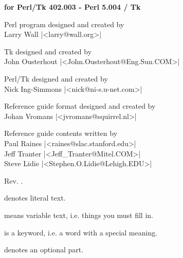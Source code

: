 \documentclass{refbase}
\begin{document}

\begin{titlepage}
\addtolength{\evensidemargin}{2cm}
\addtolength{\textwidth}{-2.1cm}

{\bf for Perl/Tk 402.003 - Perl 5.004 / Tk \tkrev}

\vfill
Perl program designed and created by \\
Larry Wall |<larry@wall.org>|

\vfill
Tk designed and created by \\
John Ousterhout |<John.Ousterhout@Eng.Sun.COM>|

\vfill
Perl/Tk designed and created by \\
Nick Ing-Simmons |<nick@ni-s.u-net.com>|

\vfill
Reference guide format designed and created by \\
Johan Vromans |<jvromans@squirrel.nl>|

\vfill
Reference guide contents written by \\
Paul Raines |<raines@slac.stanford.edu>| \\
Jeff Tranter |<Jeff_Tranter@Mitel.COM>| \\
Steve Lidie |<Stephen.O.Lidie@Lehigh.EDU>|

\vfill%

\tableofcontents
\vfill
{\small {Rev. \tkrev.\revision}}
\end{titlepage}
\clearpage
\setcounter{page}{2}


\begin{enum}{2cm}

 denotes literal text.

 means variable text, i.e. things you must fill in.

 is a keyword, i.e. a word with a special meaning.


 denotes an optional part.

\end{enum}



\newpage

\vfill
{}

\newpage

\vfill
{}
\end{document}
